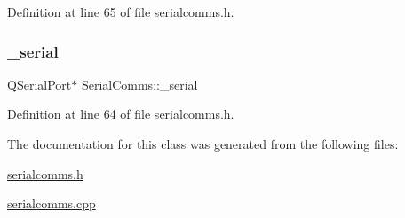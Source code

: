 Definition at line 65 of file serialcomms.\+h.

\mbox{\label{classSerialComms_a0f5a6dcd2bcf9c0b6cd6e60bbad4240e}} 
\subsubsection{\texorpdfstring{\_serial}{\_serial}}
{\footnotesize\ttfamily Q\+Serial\+Port$\ast$ Serial\+Comms\+::\+\_\+serial\hspace{0.3cm}{\ttfamily [private]}}



Definition at line 64 of file serialcomms.\+h.



The documentation for this class was generated from the following files\+:\begin{DoxyCompactItemize}
\item 
\mbox{\hyperlink{serialcomms_8h}{serialcomms.\+h}}\item 
\mbox{\hyperlink{serialcomms_8cpp}{serialcomms.\+cpp}}\end{DoxyCompactItemize}
